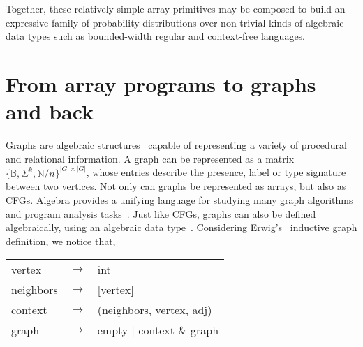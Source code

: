 \documentclass[sigplan,10pt,review,anonymous]{acmart}
\begin{document}
Together, these relatively simple array primitives may be composed to build an expressive family of probability distributions over non-trivial kinds of algebraic data types such as bounded-width regular and context-free languages.



%

\section{From array programs to graphs and back}\label{sec:graphs}

Graphs are algebraic structures~\cite{weisfeiler1968reduction} capable of representing a variety of procedural and relational information. A graph can be represented as a matrix $\{\mathbb{B}, \Sigma^k, \mathbb{N}/n\}^{|G|\times |G|}$, whose entries describe the presence, label or type signature between two vertices. Not only can graphs be represented as arrays, but also as CFGs. Algebra provides a unifying language for studying many graph algorithms and program analysis tasks~\citep{kepner2011graph}. Just like CFGs, graphs can also be defined algebraically, using an algebraic data type~\cite{mokhov2017algebraic}. Considering Erwig's~\citep{erwig2001inductive} inductive graph definition, we notice that,

  \begin{table}[H]
    \begin{tabular}{lcl}
      vertex  & $\rightarrow$ & int \\
      neighbors & $\rightarrow$ & [vertex] \\
      context & $\rightarrow$ & (neighbors, vertex, adj) \\
      graph   & $\rightarrow$ & empty | context \& graph \\
    \end{tabular}
  \end{table}
\end{document}
